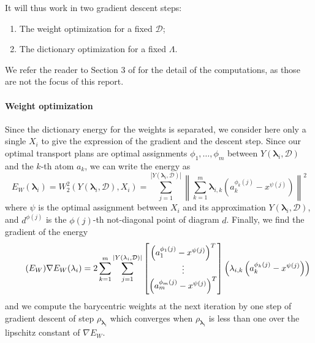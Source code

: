 \documentclass[sigconf,nonacm]{acmart}
\def\abs#1{\left|#1\right|}
\def\norm#1{\left\lVert#1\right\rVert}
\def\llambda{\mathbf{\lambda}}
\def\D{\mathcal{D}}
\begin{document}
It will thus work in two gradient descent steps:
\begin{enumerate}
	\item The weight optimization for a fixed $\D$;
	\item The dictionary optimization for a fixed $\Lambda$.
\end{enumerate}
We refer the reader to Section 3 of \cite{sisouk2023wassersteindictionariespersistencediagrams}
for the detail of the computations, as those are not the focus of this report.

\paragraph{Weight optimization}
Since the dictionary energy for the weights is separated, we consider here only a single $X_{i}$ to give
the expression of the gradient and the descent step.
Since our optimal transport plans are optimal assignments $\phi_{1}, \ldots, \phi_{m}$ between
$Y(\llambda_{i}, \D)$ and the $k$-th atom $a_{k}$, we can write the energy as
\begin{equation*}
	E_{W}(\llambda_{i}) = W_{2}^{2}(Y(\llambda_{i}, \D), X_{i}) = \sum_{j = 1}^{\abs{Y(\llambda_{i}, \D)}}\norm{\sum_{k = 1}^{m}
		\llambda_{i, k}\left(a_{k}^{\phi_{k}(j)} - x^{\psi(j)}\right)}^{2}
\end{equation*}
where $\psi$ is the optimal assignment between $X_{i}$ and its approximation $Y(\llambda_{i}, \D)$, and $d^{\phi(j)}$ is the $\phi(j)$-th not-diagonal point of diagram $d$.
Finally, we find the gradient of the energy
\begin{equation}\label{eq:ew-grad}\tag{$E_{W}$}
	\nabla E_{W}(\llambda_{i}) = 2\sum_{k = 1}^{m}\sum_{j = 1}^{\abs{Y(\llambda_{i}, \D)}}
	\begin{bmatrix}
		\left(a_{1}^{\phi_{1}(j)} - x^{\psi(j)}\right)^{T} \\
		\vdots                                             \\

		\left(a_{m}^{\phi_{m}(j)} - x^{\psi(j)}\right)^{T}
	\end{bmatrix}
	\left(\llambda_{i,k}\left(a_{k}^{\phi_{k}\left(j\right)} - x^{\psi\left(j\right)}\right)\right)
\end{equation}
and we compute the barycentric weights at the next iteration by one step of gradient descent of step
$\rho_{\llambda_{i}}$ which converges when $\rho_{\llambda_{i}}$ is less than one over the lipschitz
constant of $\nabla E_{W}$.
\end{document}

